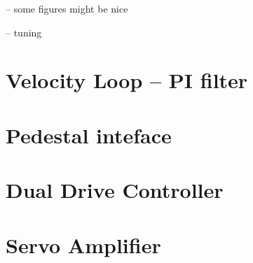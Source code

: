 \documentclass[letterpaper,12pt]{report}
\begin{document}
-- some figures might be nice

-- tuning

\section{Velocity Loop -- PI filter}


\section{Pedestal inteface}


\section{Dual Drive Controller}


\section{Servo Amplifier}
\end{document}
